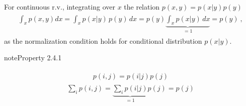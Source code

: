 \documentclass[letterpaper,10pt,english]{jupyterBook}
\begin{document}
\sphinxAtStartPar
For continuous r.v., integrating over \(x\) the relation \(p(x,y) = p(x|y) p(y)\)
\begin{equation*}
\begin{split}\begin{aligned}
  \int_{x} p(x,y) d x = \int_{x} p(x|y) \, p(y) \, dx = p(y) \underbrace{\int_{x} p(x|y) \, dx}_{= 1} = p(y) \ ,
\end{aligned}\end{split}
\end{equation*}
\sphinxAtStartPar
as the normalization condition holds for conditional distribution \(p(x|y)\).
\label{ch/prob/rv-multi-dimensional:property-0}
\begin{sphinxadmonition}{note}{Property 2.4.1}


\begin{equation*}
\begin{split}\begin{aligned}
  p(i,j) = p(i|j) p(j)
\end{aligned}\end{split}
\end{equation*}\begin{equation*}
\begin{split}\sum_i p(i,j) = \underbrace{\sum_i p(i|j)}_{=1} p(j) = p(j)\end{split}
\end{equation*}\end{sphinxadmonition}
\end{document}
